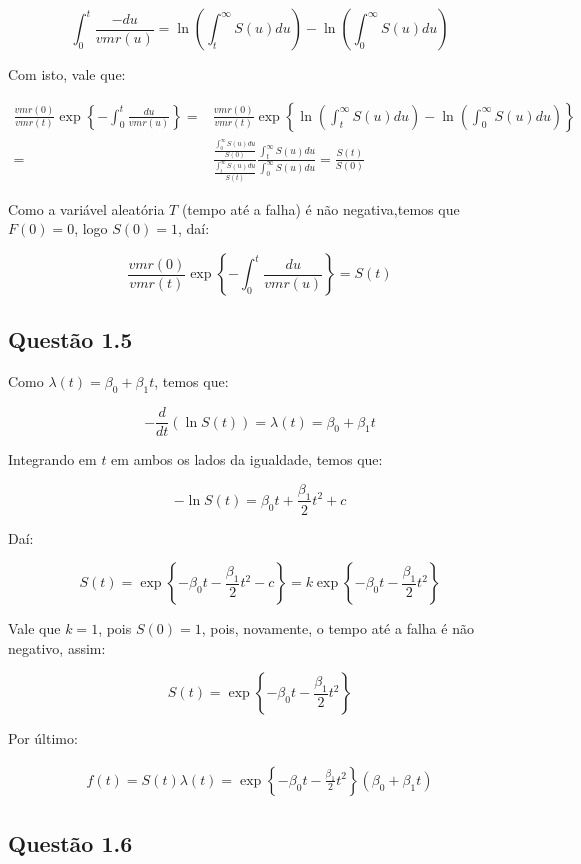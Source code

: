 \documentclass[
]{article}
\begin{document}
\[
\int_0^t\frac{-du}{vmr(u)}=\ln\left(\int_t^\infty S(u)du\right)-\ln\left(\int_0^\infty S(u)du\right)
\]

Com isto, vale que:

\[
\begin{aligned}
\frac{vmr(0)}{vmr(t)}\exp \left\{ -\int_0^t\frac{du}{vmr(u)} \right\}=&\frac{vmr(0)}{vmr(t)}\exp\left \{\ln\left(\int_t^\infty S(u)du\right)-\ln\left(\int_0^\infty S(u)du\right)\right \}\\
=&\frac{\frac{\int_0^\infty S(u)du}{S(0)}}{\frac{\int_t^\infty S(u)du}{S(t)}}\frac{ \int_t^\infty S(u)du}{ \int_0^\infty S(u)du}=\frac{S(t)}{S(0)}
\end{aligned}
\]

Como a variável aleatória \(T\) (tempo até a falha) é não negativa,temos
que \(F(0)=0\), logo \(S(0)=1\), daí:

\[
\frac{vmr(0)}{vmr(t)}\exp \left\{ -\int_0^t\frac{du}{vmr(u)} \right\}=S(t)
\]

\hypertarget{questuxe3o-1.5}{%
\subsection{Questão 1.5}\label{questuxe3o-1.5}}

Como \(\lambda(t)=\beta_0+\beta_1 t\), temos que:

\[
-\frac{d}{dt}(\ln S(t))=\lambda(t)=\beta_0+\beta_1 t
\]

Integrando em \(t\) em ambos os lados da igualdade, temos que:

\[
-\ln S(t)=\beta_0t+\frac{\beta_1}{2} t^2 + c
\]

Daí:

\[
S(t)=\exp \left \{ -\beta_0t-\frac{\beta_1}{2} t^2 - c \right \}=k\exp \left \{ -\beta_0t-\frac{\beta_1}{2} t^2\right \}
\]

Vale que \(k=1\), pois \(S(0)=1\), pois, novamente, o tempo até a falha
é não negativo, assim:

\[
S(t)=\exp \left \{ -\beta_0t-\frac{\beta_1}{2} t^2\right \}
\]

Por último:

\[
\begin{aligned}
f(t)= S(t)\lambda (t)=\exp \left \{ -\beta_0t-\frac{\beta_1}{2} t^2\right \}\left (\beta_0+\beta_1 t \right )
\end{aligned}
\]

\hypertarget{questuxe3o-1.6}{%
\subsection{Questão 1.6}\label{questuxe3o-1.6}}
\end{document}
